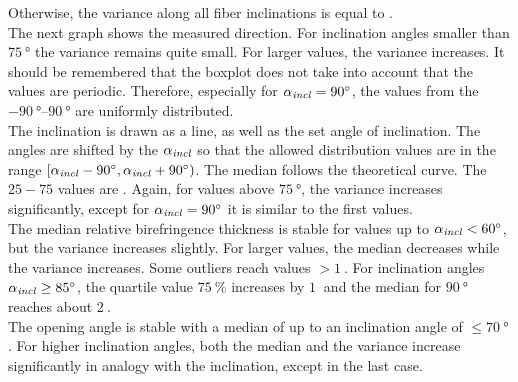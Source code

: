 Otherwise, the variance along all fiber inclinations is equal to \modelInc{}.
\\
%
The next graph shows the measured direction.
For inclination angles smaller than $\SI{75}{\degree}$ the variance remains quite small.
For larger values, the variance increases.
It should be remembered that the boxplot does not take into account that the values are periodic.
Therefore, especially for $\textnormal{$\alpha_{\mathit{incl}}$}=\SI{90}{\degree}$, the values from the $\SIrange{-90}{90}{\degree}$ are uniformly distributed.
\\
%
The inclination is drawn as a line, as well as the set angle of inclination.
The angles are shifted by the $\textnormal{$\alpha_{\mathit{incl}}$}$ so that the allowed distribution values are in the range $[\textnormal{$\alpha_{\mathit{incl}}$}-\SI{90}{\degree}, \textnormal{$\alpha_{\mathit{incl}}$}+\SI{90}{\degree})$.
The median follows the theoretical curve.
The $25-75$ values are \dummy{} .
Again, for values above $\SI{75}{\degree}$, the variance increases significantly, except for $\textnormal{$\alpha_{\mathit{incl}}$} = \SI{90}{\degree}$ it is similar to the first values.
\\
%
The median relative birefringence thickness \trel{} is stable for values up to $\textnormal{$\alpha_{\mathit{incl}}$} < \SI{60}{\degree}$, but the variance increases slightly.
For larger values, the median decreases while the variance increases.
Some outliers reach values $>\SI{1}{}$.
For inclination angles $\textnormal{$\alpha_{\mathit{incl}}$} \ge \SI{85}{\degree}$, the quartile value $\SI{75}{\percent}$ increases by $\SI{1}{}$ and the median for $\SI{90}{\degree}$ reaches about $\SI{2}{}$.
\\
%
The opening angle \modelDOmega{} is stable with a median of \dummy{} up to an inclination angle of $\le \SI{70}{\degree}$.
For higher inclination angles, both the median and the variance increase significantly in analogy with the inclination, except in the last case.
%
%
%
